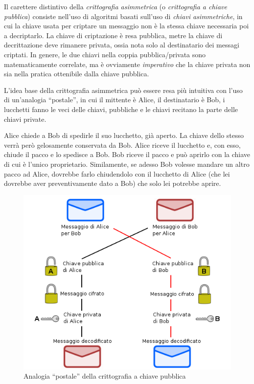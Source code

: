 \documentclass[pdflatex,11pt,a4paper,oneside]{article}
\begin{document}
Il carettere distintivo della \emph{crittografia asimmetrica} (o
\emph{crittografia a chiave pubblica}) consiste nell'uso di algoritmi
basati sull'uso di \emph{chiavi asimmetriche}, in cui la chiave usata
per criptare un messaggio non \`e la stessa chiave necessaria poi a
decriptarlo.  La chiave di criptazione \`e resa pubblica, metre la chiave
di decrittazione deve rimanere privata, ossia nota solo al destinatario
dei messagi criptati. In genere, le due chiavi nella coppia
pubblica/privata sono matematicamente correlate, ma \`e ovviamente
\emph{imperativo} che la chiave privata non sia nella pratica ottenibile
dalla chiave pubblica.

\medskip
L'idea base della crittografia asimmetrica pu\`o essere resa pi\`u
intuitiva con l'uso di un'analogia ``postale'', in cui il mittente \`e
Alice, il destinatario \`e Bob, i lucchetti fanno le veci delle chiavi,
pubbliche e le chiavi recitano la parte delle chiavi private.

Alice chiede a Bob di spedirle il suo lucchetto, gi\`a aperto. La chiave
dello stesso verr\`a per\`o gelosamente conservata da Bob. Alice riceve
il lucchetto e, con esso, chiude il pacco e lo spedisce a Bob. Bob riceve
il pacco e pu\`o aprirlo con la chiave di cui \`e l'unico proprietario.
Similamente, se adesso Bob volesse mandare un altro pacco ad Alice,
dovrebbe farlo chiudendolo con il lucchetto di Alice (che lei dovrebbe
aver preventivamente dato a Bob) che solo lei potrebbe aprire.

\begin{figure}[!h]
  \centering
    \includegraphics[scale=0.5]{pubkey-postal-analogy}
    \caption{Analogia ``postale'' della crittografia a chiave pubblica}
    \label{fig:pubkey-postal-analogy}
\end{figure}
\end{document}
